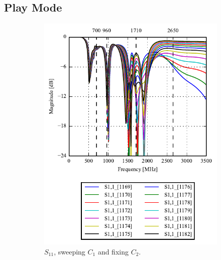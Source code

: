 \subsection{Play Mode}
\begin{figure}[htbp]
   \begin{subfigure}[b]{0.49\linewidth}
        \centering
        \includegraphics{img/tech_sol/monopole/play_mode/s11}
        \caption{$S_{11}$, sweeping $C_1$ and fixing $C_2$.}
        \label{fig:ant1_s11}
    \end{subfigure}
    \hfill
    \begin{subfigure}[b]{0.49\linewidth}
        \centering

\end{subfigure}
\end{figure}
